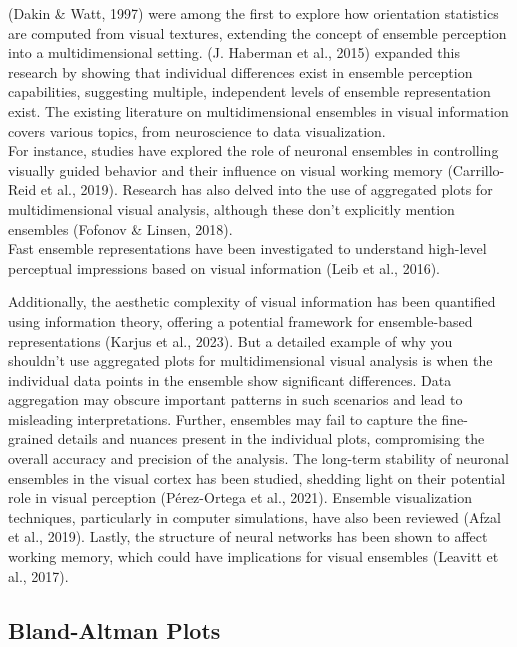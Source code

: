 \documentclass[print]{nuthesis}
\begin{document}
(Dakin \& Watt, 1997) were among the first to explore how orientation statistics are computed from visual textures, extending the concept of ensemble perception into a multidimensional setting.
(J. Haberman et al., 2015) expanded this research by showing that individual differences exist in ensemble perception capabilities, suggesting multiple, independent levels of ensemble representation exist.
The existing literature on multidimensional ensembles in visual information covers various topics, from neuroscience to data visualization.\\
For instance, studies have explored the role of neuronal ensembles in controlling visually guided behavior and their influence on visual working memory (Carrillo-Reid et al., 2019).
Research has also delved into the use of aggregated plots for multidimensional visual analysis, although these don't explicitly mention ensembles (Fofonov \& Linsen, 2018).\\
Fast ensemble representations have been investigated to understand high-level perceptual impressions based on visual information (Leib et al., 2016).

Additionally, the aesthetic complexity of visual information has been quantified using information theory, offering a potential framework for ensemble-based representations (Karjus et al., 2023).
But a detailed example of why you shouldn't use aggregated plots for multidimensional visual analysis is when the individual data points in the ensemble show significant differences. Data aggregation may obscure important patterns in such scenarios and lead to misleading interpretations.
Further, ensembles may fail to capture the fine-grained details and nuances present in the individual plots, compromising the overall accuracy and precision of the analysis.
The long-term stability of neuronal ensembles in the visual cortex has been studied, shedding light on their potential role in visual perception (Pérez-Ortega et al., 2021).
Ensemble visualization techniques, particularly in computer simulations, have also been reviewed (Afzal et al., 2019).
Lastly, the structure of neural networks has been shown to affect working memory, which could have implications for visual ensembles (Leavitt et al., 2017).

\hypertarget{bland-altman-plots}{%
\subsection{Bland-Altman Plots}\label{bland-altman-plots}}
\end{document}
